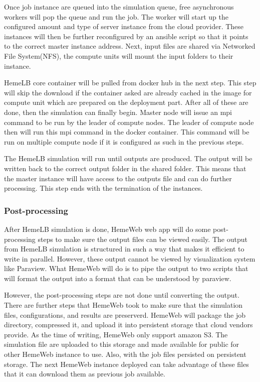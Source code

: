 Once job instance are queued into the simulation queue, free asynchronous workers will pop the queue and run the job. The worker will start up the configured amount and type of server instance from the cloud provider. These instances will then be further reconfigured by an ansible script so that it points to the correct master instance address. Next, input files are shared via Networked File System(NFS), the compute units will mount the input folders to their instance. 

HemeLB core container will be pulled from docker hub in the next step. This step will skip the download if the container asked are already cached in the image for compute unit which are prepared on the deployment part. After all of these are done, then the simulation can finally begin. Master node will issue an mpi command to be run by the leader of compute nodes. The leader of compute node then will run this mpi command in the docker container. This command will be run on multiple compute node if it is configured as such in the previous steps. 

The HemeLB simulation will run until outputs are produced. The output will be written back to the correct output folder in the shared folder. This means that the master instance will have access to the outputs file and can do further processing. This step ends with the termination of the instances.


\subsubsection{Post-processing}

After HemeLB simulation is done, HemeWeb web app will do some post-processing steps to make sure the output files can be viewed easily. The output from HemeLB simulation is structured in such a way that makes it efficient to write in parallel. However, these output cannot be viewed by visualization system like Paraview. What HemeWeb will do is to pipe the output to two scripts that will format the output into a format that can be understood by paraview.


However, the post-processing steps are not done until converting the output. There are further steps that HemeWeb took to make sure that the simulation files, configurations, and results are preserverd. HemeWeb will package the job directory, compressed it, and upload it into persistent storage that cloud vendors provide. As the time of writing, HemeWeb only support amazon S3. The simulation file are uploaded to this storage and made available for public for other HemeWeb instance to use. Also, with the job files persisted on persistent storage. The next HemeWeb instance deployed can take advantage of these files that it can download them as previous job available.







